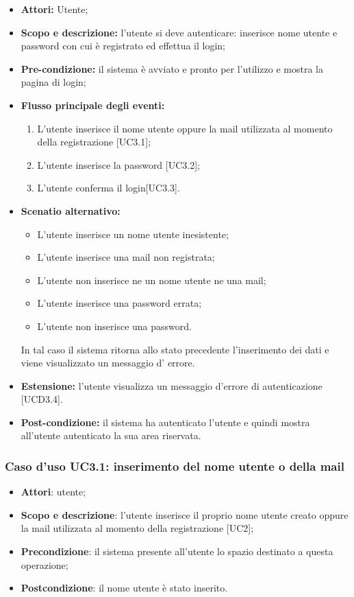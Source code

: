 \begin{itemize}
	\item \textbf{Attori:} Utente;
	\item \textbf{Scopo e descrizione:} l'utente si deve autenticare: inserisce nome utente e password con cui è registrato ed effettua il login;
	\item \textbf{Pre-condizione:} il sistema è avviato e pronto per l'utilizzo e mostra la pagina di login;
	\item \textbf{Flusso principale degli eventi:}
	\begin{enumerate}
		\item L'utente inserisce il nome utente oppure la mail utilizzata al momento della registrazione [UC3.1];
		\item L'utente inserisce la password [UC3.2];
		\item L'utente conferma il login[UC3.3].
	\end{enumerate}
	\item \textbf{Scenatio alternativo:}
	\begin{itemize}
		\item L'utente inserisce un nome utente inesistente;
		\item L'utente inserisce una mail non registrata;
		\item L'utente non inserisce ne un nome utente ne una mail;
		\item L'utente inserisce una password errata;
		\item L'utente non inserisce una password.
	\end{itemize}
	In tal caso il sistema ritorna allo stato precedente l'inserimento dei dati e viene visualizzato un messaggio d' errore.
	\item \textbf{Estensione:} l'utente visualizza un messaggio d'errore di autenticazione [UCD3.4].
	\item \textbf{Post-condizione:} il sistema ha autenticato l'utente e quindi mostra all'utente autenticato la sua area riservata.
\end{itemize}

\subsubsection{Caso d'uso UC3.1: inserimento del nome utente o della mail}
\begin{itemize}
	\item \textbf{Attori}: utente;
	\item \textbf{Scopo e descrizione}: l'utente inserisce il proprio nome utente creato oppure la mail utilizzata al momento della registrazione [UC2];
	\item \textbf{Precondizione}: il sistema presente all'utente lo spazio destinato a questa operazione;
	\item \textbf{Postcondizione}: il nome utente è stato inserito.
\end{itemize}
